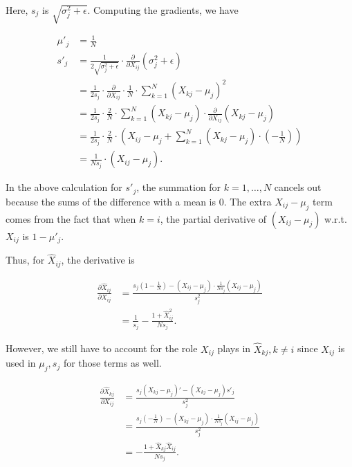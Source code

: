 \documentclass[answers]{exam}
\begin{document}
\begin{questions}
\begin{parts}
\begin{solution}
Here, $s_{j}$ is $\sqrt{\sigma^2_{j} + \epsilon}$. Computing the gradients, 
we have

\begin{align*}
\mu'_{j} &= \frac{1}{N} \\ 
s'_{j} &= \frac{1}{2\sqrt{\sigma^2_{j}+\epsilon}} \cdot \frac{\partial}{\partial X_{ij}} (\sigma^2_{j} + \epsilon) \\ 
&= \frac{1}{2s_{j}} \cdot \frac{\partial}{\partial X_{ij}} \cdot \frac{1}{N} \cdot \sum_{k=1}^{N} (X_{kj} - \mu_{j})^2 \\
&= \frac{1}{2s_{j}} \cdot \frac{2}{N} \cdot \sum_{k=1}^{N} (X_{kj} - \mu_{j}) \cdot \frac{\partial}{\partial X_{ij}} (X_{kj}-\mu_{j}) \\
&= \frac{1}{2s_{j}} \cdot \frac{2}{N} \cdot \left( X_{ij} - \mu_{j} + \sum_{k=1}^{N} (X_{kj} - \mu_{j}) \cdot \left( -\frac{1}{N} \right) \right) \\
&= \frac{1}{Ns_{j}} \cdot \left( X_{ij} - \mu_{j}\right).
\end{align*}

In the above calculation for $s'_{j}$, the summation for $k=1,\ldots,N$ cancels
out because the sums of the difference with a mean is 0. The extra 
$X_{ij} - \mu_{j}$ term comes from the fact that when $k=i$, the partial
derivative of $(X_{ij} - \mu_{j})$ w.r.t. $X_{ij}$ is $1 - \mu'_{j}$.

Thus, for $\hat{X}_{ij}$, the derivative is 

\begin{align*}
\frac{\partial \hat{X}_{ij}}{\partial X_{ij}} &= 
\frac{s_{j}(1 - \frac{1}{N}) - (X_{ij} - \mu_{j}) \cdot \frac{1}{Ns_{j}} (X_{ij} - \mu_{j})}{s_{j}^2} \\
&= \frac{1}{s_{j}} - \frac{1 + \hat{X}_{ij}^2}{Ns_{j}}
.\end{align*}

However, we still have to account for the role $X_{ij}$ plays in $\hat{X}_{kj},
k\neq i$ since $ X_{ij}$ is used in $\mu_{j}, s_{j}$ for those terms as well.

\begin{align*}
\frac{\partial \hat{X}_{kj}}{\partial X_{ij}} &= \frac{s_{j}(X_{kj}-\mu_{j})' - (X_{kj} - \mu_{j})s'_{j}}{s_{j}^2} \\ 
&= \frac{s_{j}\left( -\frac{1}{N} \right) - (X_{kj}-\mu_{j}) \cdot \frac{1}{Ns_{j}}(X_{ij}-\mu_{j})}{s_{j}^2} \\
&= -\frac{1 + \hat{X}_{kj}\hat{X}_{ij}}{Ns_{j}}
.\end{align*}


\end{solution}
\end{parts}
\end{questions}
\end{document}
